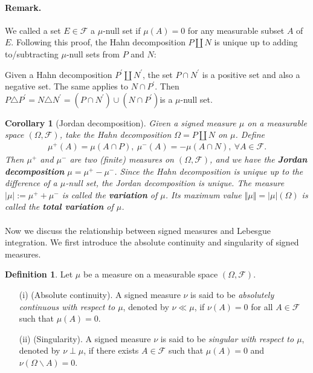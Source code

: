 \documentclass{article}
\numberwithin{equation}{section}
\theoremstyle{plain}
\newtheorem{corollary}[theorem]{Corollary}
\theoremstyle{definition}
\newtheorem{definition}[theorem]{Definition}
\begin{document}
\paragraph{Remark.} We called a set $E\in\mathscr{F}$ a $\mu$-null set if $\mu(A)=0$ for any measurable subset $A$ of $E$. Following this proof, the Hahn decomposition $P\amalg N$ is unique up to adding to/subtracting $\mu$-null sets from $P$ and $N$: 

Given a Hahn decomposition $P^\prime\amalg N^\prime$, the set $P\cap N^\prime$ is a positive set and also a negative set. The same applies to $N\cap P^\prime$. Then $P\triangle P^\prime = N\triangle N^\prime = (P\cap N^\prime)\cup(N\cap P^\prime)$is a $\mu$-null set.


\begin{corollary}[Jordan decomposition]\label{cor:1.55} Given a signed measure $\mu$ on a measurable space $(\Omega,\mathscr{F})$, take the Hahn decomposition $\Omega=P\amalg N$ on $\mu$. Define
\begin{align*}
	\mu^+(A)=\mu(A\cap P),\ \mu^-(A)=-\mu(A\cap N),\ \forall A\in\mathscr{F}.
\end{align*}
Then $\mu^+$ and $\mu^-$ are two (finite) measures on $(\Omega,\mathscr{F})$, and we have the \textbf{Jordan decomposition} $\mu=\mu^+ - \mu^-$. Since the Hahn decomposition is unique up to the difference of a $\mu$-null set, the Jordan decomposition is unique. The measure $\vert\mu\vert:=\mu^+ + \mu^-$ is called the \textbf{variation} of $\mu$. Its maximum value $\Vert\mu\Vert=\vert\mu\vert(\Omega)$ is called  the \textbf{total variation} of $\mu$. 
\end{corollary}

\paragraph{} Now we discuss the relationship between signed measures and Lebesgue integration. We first introduce the absolute continuity and singularity of signed measures.

\begin{definition}\label{def:1.56} Let $\mu$ be a measure on a measurable space $(\Omega,\mathscr{F})$. 
\begin{itemize}
	\item[(i)] (Absolute continuity). A signed measure $\nu$ is said to be \textit{absolutely continuous with respect to $\mu$}, denoted by $\nu\ll\mu$, if $\nu(A)=0$ for all $A\in\mathscr{F}$ such that $\mu(A)=0$.
	\item[(ii)] (Singularity). A signed measure $\nu$ is said to be \textit{singular with respect to $\mu$}, denoted by $\nu\perp\mu$, if there exists $A\in\mathscr{F}$ such that $\mu(A)=0$ and $\nu(\Omega\backslash A)=0$.
\end{itemize} 
\end{definition}
\end{document}
